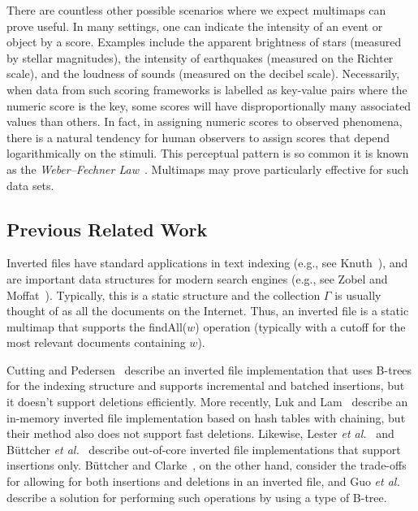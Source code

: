 \documentclass[11pt,letterpaper]{article}
\begin{document}
There are countless other possible scenarios where we expect 
multimaps can prove useful.  In many settings, one can indicate the
intensity of an event or object by a score.  Examples include the
apparent brightness of stars (measured by stellar magnitudes), the
intensity of earthquakes (measured on the Richter scale), and the
loudness of sounds (measured on the decibel scale).  Necessarily,
when data from such scoring frameworks is labelled as key-value pairs
where the numeric score is the key, some scores will have
disproportionally many associated values than others.  In fact, in
assigning numeric scores to observed phenomena, there is a natural
tendency for human observers to assign scores that depend
logarithmically on the stimuli. This perceptual pattern is so common
it is known as the
\emph{Weber--Fechner Law}~\cite{Dehaene2003145,h-vdiwf-24}.
Multimaps may prove particularly effective for such data sets.


\subsection{Previous Related Work}

Inverted files have standard applications in 
text indexing (e.g., see Knuth~\cite{k-ss-73}),
and are important data structures
for modern search engines (e.g., see Zobel and Moffat~\cite{zm-iftse-06}).
Typically, this is a static structure and the collection $\Gamma$ is
usually thought of as all the documents on the Internet.
Thus, an inverted file is a static multimap
that supports the findAll($w$) operation (typically with a cutoff for
the most relevant documents containing $w$).

Cutting and Pedersen~\cite{cp-odiim-90} describe an inverted file
implementation that uses B-trees for the indexing structure and
supports incremental and batched insertions, but it doesn't support
deletions efficiently.
More recently, Luk and Lam~\cite{ll-eimef-07} describe an in-memory
inverted file implementation based on hash tables with chaining, but
their method also does not support fast deletions.
Likewise,
Lester {\it et al.}~\cite{lmz-eoict-08,lzw-eoimc-06} 
and B\"{u}ttcher {\it et al.}~\cite{bcl-himgt-06}
describe out-of-core
inverted file implementations that support insertions only.
B\"{u}ttcher and Clarke~\cite{bc-itvqt-05},
on the other hand, 
consider the trade-offs for allowing for
both insertions and deletions in an inverted file, 
and Guo {\it et al.}~\cite{gcxw-eoli-07}
describe a solution for performing such operations
by using a type of B-tree.
\end{document}
